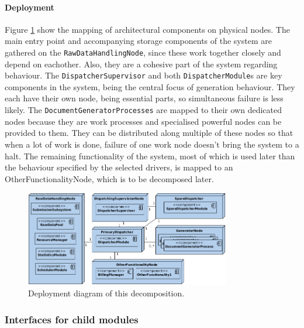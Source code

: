 \documentclass[a4paper,10pt]{article}
\begin{document}
\paragraph{Deployment}
Figure \ref{fig:it1-depl_main} show the mapping of architectural components on physical nodes.
The main entry point and accompanying storage components of the system are gathered on the \texttt{RawDataHandlingNode}, since these work together closely and depend on eachother. Also, they are a cohesive part of the system regarding behaviour. The \texttt{DispatcherSupervisor} and both \texttt{DispatcherModule}s are key components in the system, being the central focus of generation behaviour. They each have their own node, being essential parts, so simultaneous failure is less likely. The \texttt{DocumentGeneratorProcesses} are mapped to their own dedicated nodes because they are work processes and specialised powerful nodes can be provided to them. They can be distributed along multiple of these nodes so that when a lot of work is done, failure of one work node doesn't bring the system to a halt. The remaining functionality of the system, most of which is used later than the behaviour specified by the selected drivers, is mapped to an OtherFunctionalityNode, which is to be decomposed later.

\begin{figure}[!htp]
    \centering
    \includegraphics[width=0.8\textwidth]{depl_diag_1.png}
    \caption{Deployment diagram of this decomposition.}\label{fig:it1-depl_main}
\end{figure}

\subsubsection{Interfaces for child modules}
\end{document}
